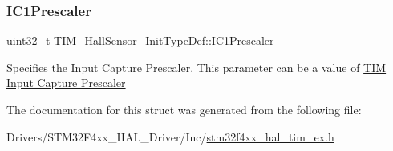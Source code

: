 \subsubsection{\texorpdfstring{I\+C1\+Prescaler}{IC1Prescaler}}
{\footnotesize\ttfamily uint32\+\_\+t T\+I\+M\+\_\+\+Hall\+Sensor\+\_\+\+Init\+Type\+Def\+::\+I\+C1\+Prescaler}

Specifies the Input Capture Prescaler. This parameter can be a value of \hyperlink{group___t_i_m___input___capture___prescaler}{T\+IM Input Capture Prescaler} 

The documentation for this struct was generated from the following file\+:\begin{DoxyCompactItemize}
\item 
Drivers/\+S\+T\+M32\+F4xx\+\_\+\+H\+A\+L\+\_\+\+Driver/\+Inc/\hyperlink{stm32f4xx__hal__tim__ex_8h}{stm32f4xx\+\_\+hal\+\_\+tim\+\_\+ex.\+h}\end{DoxyCompactItemize}
